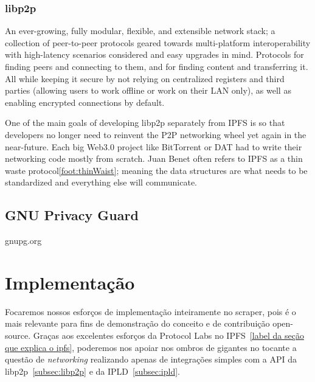 \subsubsection{\label{subsec:libp2p}libp2p}

An ever-growing, fully modular, flexible, and extensible network stack; a collection of peer-to-peer protocols geared towards multi-platform interoperability with high-latency scenarios considered and easy upgrades in mind.
Protocols for finding peers and connecting to them, and for finding content and transferring it.
All while keeping it secure by not relying on centralized registers and third parties (allowing users to work offline or work on their LAN only), as well as enabling encrypted connections by default.

One of the main goals of developing libp2p separately from IPFS is so that developers no longer need to reinvent the P2P networking wheel yet again in the near-future.
Each big Web3.0 project like BitTorrent or DAT had to write their networking code mostly from scratch.
Juan Benet often refers to IPFS as a thin waste protocol\ref{foot:thinWaist}; meaning the data structures are what needs to be standardized and everything else will communicate.

\subsection{GNU Privacy Guard}
gnupg.org

\section{Implementação}

Focaremos nossos esforços de implementação inteiramente no scraper, pois é o mais relevante para fins de demonstração do conceito e de contribuição open-source.
Graças aos excelentes esforços da Protocol Labs no IPFS~\ref{label da seção que explica o ipfs}, poderemos nos apoiar nos ombros de gigantes no tocante a questão de \textit{networking} realizando apenas de integrações simples com a API da libp2p~\ref{subsec:libp2p} e da IPLD~\ref{subsec:ipld}.

